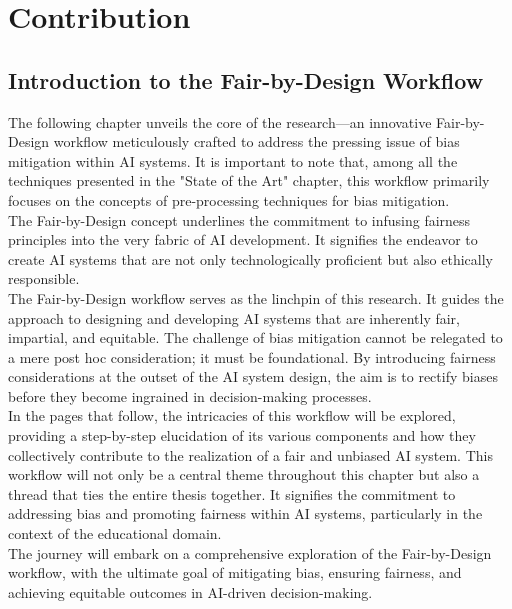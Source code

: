 \documentclass[12pt,a4paper,openright,twoside]{book}
\begin{document}
\chapter{Contribution} %
\label{chap:contibution}
\section{Introduction to the Fair-by-Design Workflow}
The following chapter unveils the core of the research—an innovative Fair-by-Design workflow meticulously crafted to address the pressing issue of bias mitigation within AI systems. It is important to note that, among all the techniques presented in the "State of the Art" chapter, this workflow primarily focuses on the concepts of pre-processing techniques for bias mitigation. \\
The Fair-by-Design concept underlines the commitment to infusing fairness principles into the very fabric of AI development. It signifies the endeavor to create AI systems that are not only technologically proficient but also ethically responsible. \\
The Fair-by-Design workflow serves as the linchpin of this research. It guides the approach to designing and developing AI systems that are inherently fair, impartial, and equitable. The challenge of bias mitigation cannot be relegated to a mere post hoc consideration; it must be foundational. By introducing fairness considerations at the outset of the AI system design, the aim is to rectify biases before they become ingrained in decision-making processes. \\
In the pages that follow, the intricacies of this workflow will be explored, providing a step-by-step elucidation of its various components and how they collectively contribute to the realization of a fair and unbiased AI system. This workflow will not only be a central theme throughout this chapter but also a thread that ties the entire thesis together. It signifies the commitment to addressing bias and promoting fairness within AI systems, particularly in the context of the educational domain. \\
The journey will embark on a comprehensive exploration of the Fair-by-Design workflow, with the ultimate goal of mitigating bias, ensuring fairness, and achieving equitable outcomes in AI-driven decision-making.
\end{document}
